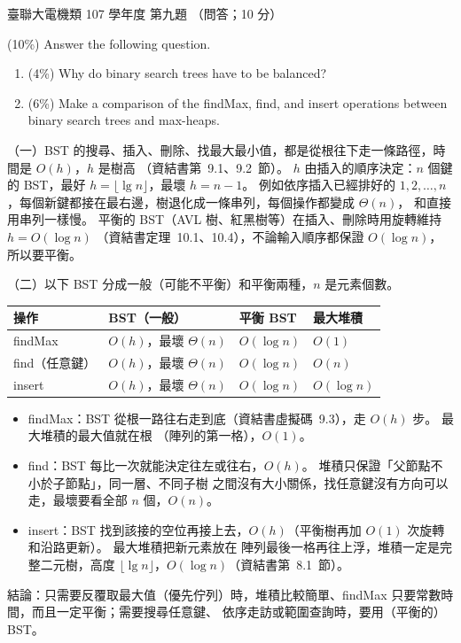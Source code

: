 \begin{pastexam}[label={px:ust-107-ee-ds-09}]{臺聯大電機類 107 學年度 第九題}
（問答；10 分）

(10\%) Answer the following question.
\begin{enumerate}
\item[(一)] (4\%) Why do binary search trees have to be balanced?
\item[(二)] (6\%) Make a comparison of the \textsf{findMax}, \textsf{find}, and \textsf{insert} operations between binary search trees and max-heaps.
\end{enumerate}
\end{pastexam}

\begin{pastsoln}
（一）BST 的搜尋、插入、刪除、找最大最小值，都是從根往下走一條路徑，時間是 $O(h)$，$h$ 是樹高
（資結書第~9.1、9.2~節）。 $h$ 由插入的順序決定：$n$ 個鍵的 BST，最好 $h = \lfloor \lg n \rfloor$，最壞 $h = n - 1$。
例如依序插入已經排好的 $1, 2, \ldots, n$，每個新鍵都接在最右邊，樹退化成一條串列，每個操作都變成 $\Theta(n)$，
和直接用串列一樣慢。 平衡的 BST（AVL 樹、紅黑樹等）在插入、刪除時用旋轉維持 $h = O(\log n)$
（資結書定理~10.1、10.4），不論輸入順序都保證 $O(\log n)$，所以要平衡。

（二）以下 BST 分成一般（可能不平衡）和平衡兩種，$n$ 是元素個數。
\begin{center}
\small
\begin{tabular}{llll}
\toprule
操作 & BST（一般） & 平衡 BST & 最大堆積 \\
\midrule
\textsf{findMax} & $O(h)$，最壞 $\Theta(n)$ & $O(\log n)$ & $O(1)$ \\
\textsf{find}（任意鍵） & $O(h)$，最壞 $\Theta(n)$ & $O(\log n)$ & $O(n)$ \\
\textsf{insert} & $O(h)$，最壞 $\Theta(n)$ & $O(\log n)$ & $O(\log n)$ \\
\bottomrule
\end{tabular}
\end{center}
\begin{itemize}
\item \textsf{findMax}：BST 從根一路往右走到底（資結書虛擬碼~9.3），走 $O(h)$ 步。 最大堆積的最大值就在根
（陣列的第一格），$O(1)$。
\item \textsf{find}：BST 每比一次就能決定往左或往右，$O(h)$。 堆積只保證「父節點不小於子節點」，同一層、不同子樹
之間沒有大小關係，找任意鍵沒有方向可以走，最壞要看全部 $n$ 個，$O(n)$。
\item \textsf{insert}：BST 找到該接的空位再接上去，$O(h)$（平衡樹再加 $O(1)$ 次旋轉和沿路更新）。 最大堆積把新元素放在
陣列最後一格再往上浮，堆積一定是完整二元樹，高度 $\lfloor \lg n \rfloor$，$O(\log n)$（資結書第~8.1~節）。
\end{itemize}
結論：只需要反覆取最大值（優先佇列）時，堆積比較簡單、\textsf{findMax} 只要常數時間，而且一定平衡；需要搜尋任意鍵、
依序走訪或範圍查詢時，要用（平衡的）BST。
\end{pastsoln}
